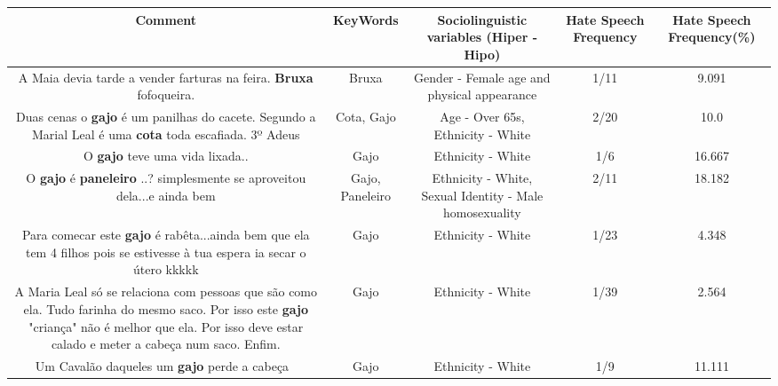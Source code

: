 \documentclass[11pt]{article}
\newlength\mylength
\begin{document}
\begin{center}
\setlength\mylength{\dimexpr\textwidth - 1\arrayrulewidth - 50\tabcolsep}
\begin{longtable}{|C{.65\mylength}|C{.30\mylength}|C{.12\mylength}|C{.12\mylength}|C{.12\mylength}|}
\hline
\textbf{Comment} & \textbf{KeyWords} & \textbf{Sociolinguistic variables (Hiper - Hipo)}  & \textbf{Hate Speech Frequency} & \textbf{Hate Speech Frequency(\%)} \\
\hline{}\small A Maia devia tarde a vender farturas na feira. \textbf{Bruxa} fofoqueira.\normalsize   & Bruxa & Gender - Female age and physical appearance & 1/11 & 9.091 \\  \hline
  \small Duas cenas o \textbf{gajo} é um panilhas do cacete. Segundo a Marial Leal é uma \textbf{cota} toda escafiada. 3º Adeus\normalsize   & Cota, Gajo & Age - Over 65s, Ethnicity - White & 2/20 & 10.0 \\  \hline
  \small O \textbf{gajo} teve uma vida lixada..\normalsize   & Gajo & Ethnicity - White & 1/6 & 16.667 \\  \hline
  \small O \textbf{gajo} é \textbf{paneleiro} ..? simplesmente se aproveitou dela...e ainda bem\normalsize   & Gajo, Paneleiro & Ethnicity - White, Sexual Identity - Male homosexuality & 2/11 & 18.182 \\  \hline
  \small Para comecar este \textbf{gajo} é rabêta...ainda bem que ela tem 4 filhos pois se estivesse à tua espera ia secar o útero kkkkk\normalsize   & Gajo & Ethnicity - White & 1/23 & 4.348 \\  \hline
  \small A Maria Leal só se relaciona com pessoas que são como ela. Tudo farinha do mesmo saco. Por isso este \textbf{gajo} "criança" não é melhor que ela. Por isso deve estar calado e meter a cabeça num saco. Enfim.\normalsize   & Gajo & Ethnicity - White & 1/39 & 2.564 \\  \hline
  \small Um Cavalão daqueles um \textbf{gajo} perde a cabeça 🤭\normalsize   & Gajo & Ethnicity - White & 1/9 & 11.111 \\  \hline

\end{longtable}
\end{center}
\end{document}
